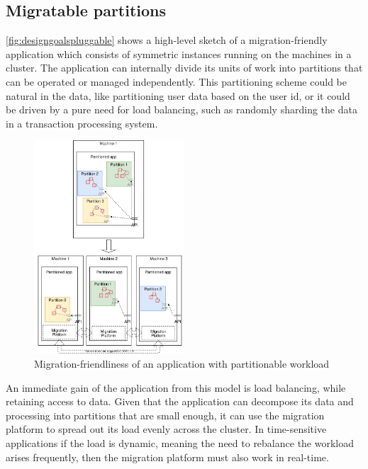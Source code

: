 \subsection{Migratable partitions}
\label{sec:migpar}
\autoref{fig:designgoalspluggable} shows a high-level sketch of a
migration-friendly application which consists of symmetric instances
running on the machines in a cluster. The application can internally
divide its units of work into partitions that can be operated or
managed independently.
This partitioning scheme could be natural in the data, like
partitioning user data based on the user id, or it could be driven
by a pure need for load balancing, such as randomly sharding the data
in a transaction processing system.


\begin{figure}[t]
\centering

\includegraphics[width=0.5\textwidth]{design-goals-pluggable.drawio}
\caption{
    Migration-friendliness of an application with partitionable workload
}
\label{fig:designgoalspluggable}
\end{figure}

An immediate gain of the application from this model is load balancing,
while retaining access to data.
Given that the application can decompose its data and processing into
partitions that are small enough, it can use the migration platform to
spread
out its load evenly across the cluster. In time-sensitive applications
if the load is dynamic,
meaning the need to rebalance the workload arises frequently,
then the migration platform must also work in real-time.

